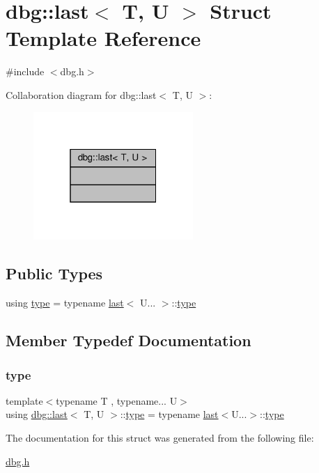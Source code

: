 \hypertarget{structdbg_1_1last}{}\section{dbg\+:\+:last$<$ T, U $>$ Struct Template Reference}
\label{structdbg_1_1last}


{\ttfamily \#include $<$dbg.\+h$>$}



Collaboration diagram for dbg\+:\+:last$<$ T, U $>$\+:\nopagebreak
\begin{figure}[H]
\begin{center}
\leavevmode
\includegraphics[width=172pt]{d8/d7e/structdbg_1_1last__coll__graph}
\end{center}
\end{figure}
\subsection*{Public Types}
\begin{DoxyCompactItemize}
\item 
using \hyperlink{structdbg_1_1last_aac2d6dd66fecfc0f3f37ecb4a02b0779}{type} = typename \hyperlink{structdbg_1_1last}{last}$<$ U... $>$\+::\hyperlink{structdbg_1_1last_aac2d6dd66fecfc0f3f37ecb4a02b0779}{type}
\end{DoxyCompactItemize}


\subsection{Member Typedef Documentation}
\mbox{\label{structdbg_1_1last_aac2d6dd66fecfc0f3f37ecb4a02b0779}} 
\subsubsection{\texorpdfstring{type}{type}}
{\footnotesize\ttfamily template$<$typename T , typename... U$>$ \\
using \hyperlink{structdbg_1_1last}{dbg\+::last}$<$ T, U $>$\+::\hyperlink{structdbg_1_1last_aac2d6dd66fecfc0f3f37ecb4a02b0779}{type} =  typename \hyperlink{structdbg_1_1last}{last}$<$U...$>$\+::\hyperlink{structdbg_1_1last_aac2d6dd66fecfc0f3f37ecb4a02b0779}{type}}



The documentation for this struct was generated from the following file\+:\begin{DoxyCompactItemize}
\item 
\hyperlink{dbg_8h}{dbg.\+h}\end{DoxyCompactItemize}
